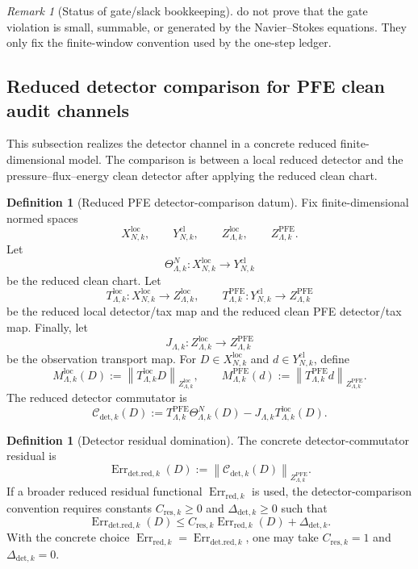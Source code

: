 \documentclass[11pt]{article}
\numberwithin{equation}{section}
\theoremstyle{plain}
\theoremstyle{definition}
\newtheorem{definition}[theorem]{Definition}
\theoremstyle{remark}
\newtheorem{remark}[theorem]{Remark}
\newcommand{\loc}{\mathrm{loc}}
\newcommand{\cl}{\mathrm{cl}}
\newcommand{\norm}[1]{\left\lVert #1\right\rVert}
\begin{document}
\begin{remark}[Status of gate/slack bookkeeping]
 do not prove that the
gate violation is small, summable, or generated by the Navier--Stokes
equations.  They only fix the finite-window convention used by the one-step
ledger.
\end{remark}

\subsection{Reduced detector comparison for PFE clean audit channels}

This subsection realizes the detector channel in a concrete reduced
finite-dimensional model.  The comparison is between a local reduced detector
and the pressure--flux--energy clean detector after applying the reduced clean
chart.

\begin{definition}[Reduced PFE detector-comparison datum]
\label{def:reduced-pfe-detector-datum}
Fix finite-dimensional normed spaces
\[
  X_{N,k}^{\loc},
  \qquad
  Y_{N,k}^{\cl},
  \qquad
  Z_{\Lambda,k}^{\loc},
  \qquad
  Z_{\Lambda,k}^{\mathrm{PFE}}.
\]
Let
\[
  \Theta_{\Lambda,k}^{N}:X_{N,k}^{\loc}\to Y_{N,k}^{\cl}
\]
be the reduced clean chart.  Let
\[
  T_{\Lambda,k}^{\loc}:X_{N,k}^{\loc}\to Z_{\Lambda,k}^{\loc},
  \qquad
  T_{\Lambda,k}^{\mathrm{PFE}}:
  Y_{N,k}^{\cl}\to Z_{\Lambda,k}^{\mathrm{PFE}}
\]
be the reduced local detector/tax map and the reduced clean PFE detector/tax
map.  Finally, let
\[
  J_{\Lambda,k}:Z_{\Lambda,k}^{\loc}\to Z_{\Lambda,k}^{\mathrm{PFE}}
\]
be the observation transport map.  For \(D\in X_{N,k}^{\loc}\) and
\(d\in Y_{N,k}^{\cl}\), define
\[
  M_{\Lambda,k}^{\loc}(D)
  :=
  \norm{T_{\Lambda,k}^{\loc}D}_{Z_{\Lambda,k}^{\loc}},
  \qquad
  M_{\Lambda,k}^{\mathrm{PFE}}(d)
  :=
  \norm{T_{\Lambda,k}^{\mathrm{PFE}}d}_{Z_{\Lambda,k}^{\mathrm{PFE}}}.
\]
The reduced detector commutator is
\[
  \mathcal C_{\mathrm{det},k}(D)
  :=
  T_{\Lambda,k}^{\mathrm{PFE}}\Theta_{\Lambda,k}^{N}(D)
  -
  J_{\Lambda,k}T_{\Lambda,k}^{\loc}(D).
\]
\end{definition}

\begin{definition}[Detector residual domination]
\label{def:reduced-detector-residual}
The concrete detector-commutator residual is
\[
  \operatorname{Err}_{\mathrm{det.red},k}(D)
  :=
  \norm{\mathcal C_{\mathrm{det},k}(D)}_{Z_{\Lambda,k}^{\mathrm{PFE}}}.
\]
If a broader reduced residual functional \(\operatorname{Err}_{\mathrm{red},k}\)
is used, the detector-comparison convention requires constants
\(C_{\mathrm{res},k}\ge0\) and \(\Delta_{\mathrm{det},k}\ge0\) such that
\[
  \operatorname{Err}_{\mathrm{det.red},k}(D)
  \le
  C_{\mathrm{res},k}\operatorname{Err}_{\mathrm{red},k}(D)
  +
  \Delta_{\mathrm{det},k}.
\]
With the concrete choice
\(\operatorname{Err}_{\mathrm{red},k}=\operatorname{Err}_{\mathrm{det.red},k}\),
one may take \(C_{\mathrm{res},k}=1\) and
\(\Delta_{\mathrm{det},k}=0\).
\end{definition}
\end{document}
